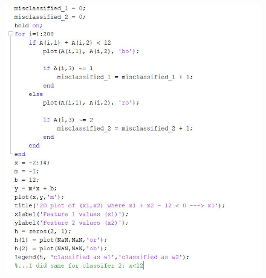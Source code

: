 \documentclass[a4paper,12pt]{article}
\begin{document}
\begin{figure}[H]
\includegraphics[scale=0.48]{matlab_code_3.jpg}
\end{figure}
\end{document}
